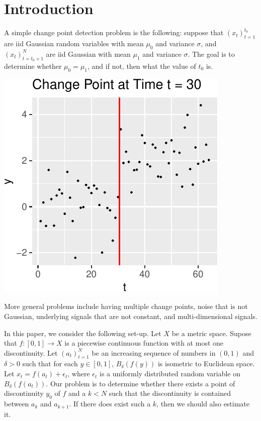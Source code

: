 \documentclass[smallextended]{svjour3}       %
\begin{document}
\section{Introduction}\label{intro}

A simple change point detection problem is the following: suppose that
\((x_t)_{t = 1}^{t_0}\) are iid Gaussian random variables with mean
\(\mu_0\) and variance \(\sigma\), and \((x_t)_{t = t_0 + 1}^N\) are iid
Gaussian with mean \(\mu_1\) and variance \(\sigma\). The goal is to
determine whether \(\mu_0 = \mu_1\), and if not, then what the value of
\(t_0\) is.

\begin{center}\includegraphics{springer_template_files/figure-latex/chunk_1-1} \end{center}

More general problems include having multiple change points, noise that
is not Gaussian, underlying signals that are not constant, and
multi-dimensional signals.

In this paper, we consider the following set-up. Let \(X\) be a metric
space. Supose that \(f:[0,1]\to X\) is a piecewise continuous function
with at most one discontinuity. Let \((a_t)_{t = 1}^N\) be an increasing
sequence of numbers in \((0, 1)\) and \(\delta > 0\) such that for each
\(y\in [0,1]\), \(B_\delta(f(y))\) is isometric to Euclidean space. Let
\(x_t = f(a_t) + \epsilon_t\), where \(\epsilon_t\) is a uniformly
distributed random variable on \(B_\delta(f(a_t))\). Our problem is to
determine whether there exists a point of discontinuity \(y_0\) of \(f\)
and a \(k < N\) such that the discontinuity is contained between \(a_k\)
and \(a_{k +1}\). If there does exist such a \(k\), then we should also
estimate it.
\end{document}
